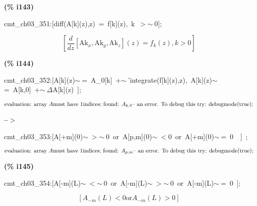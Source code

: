 \documentclass[fleqn]{article}
\begin{document}
\noindent
\begin{minipage}[t]{4.000000em}\color{red}\bfseries
(\% i143)	
\end{minipage}
\begin{minipage}[t]{\textwidth}\color{blue}
cmt\_ch03\_351:[diff(A[k](z),z)\ =\ f[k](z),\ k\ \ensuremath{>}\ensuremath{\sim\ }0];
\end{minipage}
\[\displaystyle \tag{cmt\_ ch03\_ 351} 
\left[ \frac{d}{d z} \left[ {{\ensuremath{\mathrm{Ak}}}_x}\operatorname{,}{{\ensuremath{\mathrm{Ak}}}_y}\operatorname{,}{{\ensuremath{\mathrm{Ak}}}_z}\right] (z)={f_k}(z)\operatorname{,}k\operatorname{>  }0\right] \mbox{}
\]


\noindent
\begin{minipage}[t]{4.000000em}\color{red}\bfseries
(\% i144)	
\end{minipage}
\begin{minipage}[t]{\textwidth}\color{blue}
cmt\_ch03\_352:[A[k](z)\ensuremath{\sim\ }=\ A\_0[k]\ +\ensuremath{\sim\ }'integrate(f[k](z),z),\ A[k](z)\ensuremath{\sim\ }=\ A[k,0]\ +\ensuremath{\sim\ }\ensuremath{\Delta}A[k](z)\ ];
\end{minipage}
\[\displaystyle \mbox{}\\\mbox{%
evaluation: array }A\mbox{%
 must have }1\mbox{%
 indices; found: }{A_{k,0}}\mbox{%
 -- an error. To debug this try: debugmode(true);}\mbox{}
\]


\noindent
\begin{minipage}[t]{4.000000em}\color{red}\bfseries
 --\ensuremath{\ensuremath{>}}	
\end{minipage}
\begin{minipage}[t]{\textwidth}\color{blue}
cmt\_ch03\_353:[A[+m](0)\ensuremath{\sim\ }\ensuremath{>}\ensuremath{\sim\ }0\ or\ A[p,m](0)\ensuremath{\sim\ }\ensuremath{<}0\ or\ A[+m](0)\ensuremath{\sim\ }=\ 0\ \ ]\ ;
\end{minipage}
\[\displaystyle \mbox{}\\\mbox{%
evaluation: array }A\mbox{%
 must have }1\mbox{%
 indices; found: }{A_{p,m}}\mbox{%
 -- an error. To debug this try: debugmode(true);}\mbox{}
\]


\noindent
\begin{minipage}[t]{4.000000em}\color{red}\bfseries
(\% i145)	
\end{minipage}
\begin{minipage}[t]{\textwidth}\color{blue}
cmt\_ch03\_354:[A[-m](L)\ensuremath{\sim\ }\ensuremath{<}\ensuremath{\sim\ }0\ or\ A[-m](L)\ensuremath{\sim\ }\ensuremath{>}\ensuremath{\sim\ }0\ or\ A[-m](L)\ensuremath{\sim\ }=\ 0\ ];
\end{minipage}
\[\displaystyle \tag{cmt\_ ch03\_ 354} 
\left[ {A_{-m}}(L)\operatorname{<  }0\ensuremath{\mathrm{ or }}{A_{-m}}(L)\operatorname{>  }0\right] \mbox{}
\]
\end{document}

